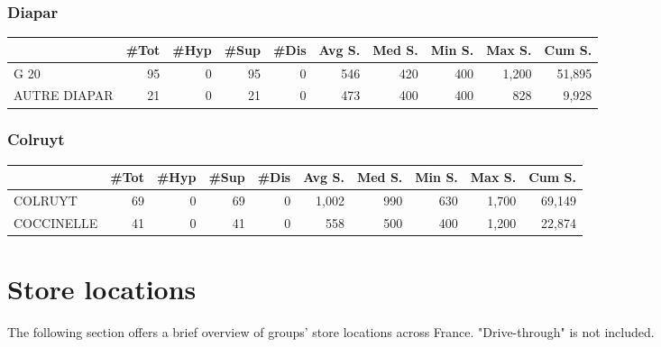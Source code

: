 \documentclass[11pt]{article}
\begin{document}
\subsubsection{Diapar}

\begin{table}[H]
\footnotesize
\setlength{\tabcolsep}{2pt}

\begin{tabular}{lrrrrrrrrr}
\toprule
{} &       \#Tot &       \#Hyp &       \#Sup &       \#Dis &     Avg S. &     Med S. &     Min S. &     Max S. &     Cum S. \\
\midrule
G 20         &         95 &          0 &         95 &          0 &        546 &        420 &        400 &      1,200 &     51,895 \\
AUTRE DIAPAR &         21 &          0 &         21 &          0 &        473 &        400 &        400 &        828 &      9,928 \\
\bottomrule
\end{tabular}

\end{table}


\subsubsection{Colruyt}

\begin{table}[H]
\footnotesize
\setlength{\tabcolsep}{2pt}

\begin{tabular}{lrrrrrrrrr}
\toprule
{} &       \#Tot &       \#Hyp &       \#Sup &       \#Dis &     Avg S. &     Med S. &     Min S. &     Max S. &     Cum S. \\
\midrule
COLRUYT    &         69 &          0 &         69 &          0 &      1,002 &        990 &        630 &      1,700 &     69,149 \\
COCCINELLE &         41 &          0 &         41 &          0 &        558 &        500 &        400 &      1,200 &     22,874 \\
\bottomrule
\end{tabular}

\end{table}

\section{Store locations}

The following section offers a brief overview of groups' store locations across France. "Drive-through" is not included.
\end{document}
